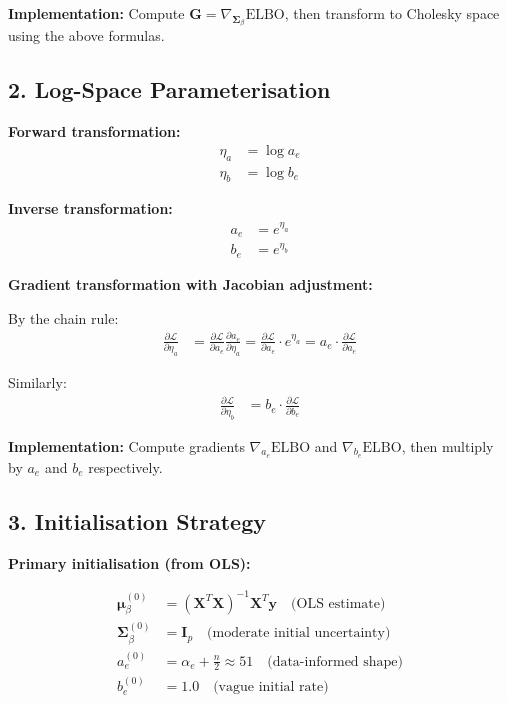 \documentclass[11pt,a4paper]{article}
\newcommand{\ELBO}{\text{ELBO}}
\begin{document}
\textbf{Implementation:} Compute $\bm{G} = \nabla_{\bm{\Sigma}_\beta} \ELBO$, then transform to Cholesky space using the above formulas.

\subsection*{2. Log-Space Parameterisation}

\textbf{Forward transformation:}
\begin{align}
\eta_a &= \log a_e\\
\eta_b &= \log b_e
\end{align}

\textbf{Inverse transformation:}
\begin{align}
a_e &= e^{\eta_a}\\
b_e &= e^{\eta_b}
\end{align}

\textbf{Gradient transformation with Jacobian adjustment:}

By the chain rule:
\begin{align}
\frac{\partial \mathcal{L}}{\partial \eta_a} &= \frac{\partial \mathcal{L}}{\partial a_e} \frac{\partial a_e}{\partial \eta_a} = \frac{\partial \mathcal{L}}{\partial a_e} \cdot e^{\eta_a} = a_e \cdot \frac{\partial \mathcal{L}}{\partial a_e}
\end{align}

Similarly:
\begin{align}
\frac{\partial \mathcal{L}}{\partial \eta_b} &= b_e \cdot \frac{\partial \mathcal{L}}{\partial b_e}
\end{align}

\textbf{Implementation:} Compute gradients $\nabla_{a_e} \ELBO$ and $\nabla_{b_e} \ELBO$, then multiply by $a_e$ and $b_e$ respectively.

\subsection*{3. Initialisation Strategy}

\textbf{Primary initialisation (from OLS):}

\begin{align}
\bm{\mu}_\beta^{(0)} &= (\bm{X}^T \bm{X})^{-1} \bm{X}^T \bm{y} \quad \text{(OLS estimate)}\\
\bm{\Sigma}_\beta^{(0)} &= \bm{I}_p \quad \text{(moderate initial uncertainty)}\\
a_e^{(0)} &= \alpha_e + \frac{n}{2} \approx 51 \quad \text{(data-informed shape)}\\
b_e^{(0)} &= 1.0 \quad \text{(vague initial rate)}
\end{align}
\end{document}
